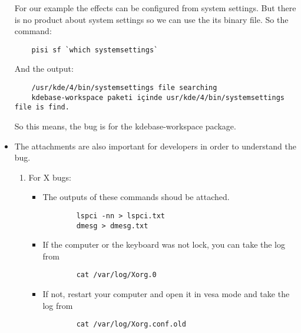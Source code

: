 \documentclass[a4paper,10pt]{article}
\begin{document}
\begin{itemize}
	For our example the effects can be configured from system settings. But there is no product about system settings so we can use the its binary file. So the command:
	\begin{verbatim}
	pisi sf `which systemsettings`
	\end{verbatim}

	And the output:
	\begin{verbatim}
	/usr/kde/4/bin/systemsettings file searching
	kdebase-workspace paketi içinde usr/kde/4/bin/systemsettings file is find.
	\end{verbatim}
	So this means, the bug is for the kdebase-workspace package.

  \item The attachments are also important for developers in order to understand the bug.
	\begin{enumerate}
	\item For X bugs:
	\begin{itemize}
		\item The outputs of these commands shoud be attached.
		\begin{verbatim}
		lspci -nn > lspci.txt
		dmesg > dmesg.txt
		\end{verbatim}
		\item If the computer or the keyboard was not lock, you can take the log from 
		\begin{verbatim}
		cat /var/log/Xorg.0
		\end{verbatim}
		\item If not, restart your computer and open it in vesa mode and take the log from
		\begin{verbatim}
		cat /var/log/Xorg.conf.old
		\end{verbatim}


\end{itemize}
\end{enumerate}
\end{itemize}
\end{document}
